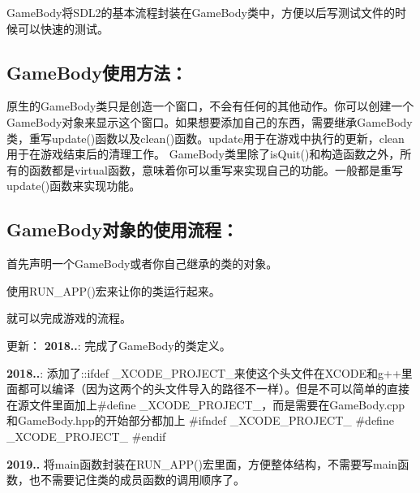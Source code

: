Game\+Body将\+S\+D\+L2的基本流程封装在\+Game\+Body类中，方便以后写测试文件的时候可以快速的测试。 \subsection*{Game\+Body使用方法：}

原生的\+Game\+Body类只是创造一个窗口，不会有任何的其他动作。你可以创建一个\+Game\+Body对象来显示这个窗口。如果想要添加自己的东西，需要继承\+Game\+Body类，重写update()函数以及clean()函数。update用于在游戏中执行的更新，clean用于在游戏结束后的清理工作。 Game\+Body类里除了is\+Quit()和构造函数之外，所有的函数都是virtual函数，意味着你可以重写来实现自己的功能。一般都是重写update()函数来实现功能。 \subsection*{Game\+Body对象的使用流程：}


\begin{DoxyEnumerate}
\item 首先声明一个\+Game\+Body或者你自己继承的类的对象。
\item 使用\+R\+U\+N\+\_\+\+A\+P\+P()宏来让你的类运行起来。
\end{DoxyEnumerate}

就可以完成游戏的流程。

更新： {\bfseries{2018..}}\+: 完成了\+Game\+Body的类定义。

{\bfseries{2018..}}\+: 添加了\+::ifdef \+\_\+\+X\+C\+O\+D\+E\+\_\+\+P\+R\+O\+J\+E\+C\+T\+\_\+来使这个头文件在\+X\+C\+O\+D\+E和g++里面都可以编译（因为这两个的头文件导入的路径不一样）。但是不可以简单的直接在源文件里面加上\#define \+\_\+\+X\+C\+O\+D\+E\+\_\+\+P\+R\+O\+J\+E\+C\+T\+\_\+，而是需要在\+Game\+Body.\+cpp和\+Game\+Body.\+hpp的开始部分都加上 \#ifndef \+\_\+\+X\+C\+O\+D\+E\+\_\+\+P\+R\+O\+J\+E\+C\+T\+\_\+ \#define \+\_\+\+X\+C\+O\+D\+E\+\_\+\+P\+R\+O\+J\+E\+C\+T\+\_\+ \#endif

{\bfseries{2019..}} 将main函数封装在\+R\+U\+N\+\_\+\+A\+P\+P()宏里面，方便整体结构，不需要写main函数，也不需要记住类的成员函数的调用顺序了。 